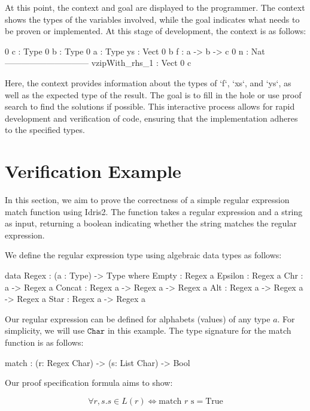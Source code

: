 \documentclass[]{rptuseminar}
\begin{document}
At this point, the context and goal are displayed to the programmer. The context shows the types of the variables involved, while the goal indicates what needs to be proven or implemented. At this stage of development, the context is as follows:

\begin{idris}
 0 c : Type
 0 b : Type
 0 a : Type
   ys : Vect 0 b
   f : a -> b -> c
 0 n : Nat
------------------------------
vzipWith_rhs_1 : Vect 0 c
\end{idris}

Here, the context provides information about the types of `f`, `xs`, and `ys`, as well as the expected type of the result. The goal is to fill in the hole or use proof search to find the solutions if possible. This interactive process allows for rapid development and verification of code, ensuring that the implementation adheres to the specified types.

\section{Verification Example}  
\label{sec:verification-example}  

In this section, we aim to prove the correctness of a simple regular expression match function using Idris2. The function takes a regular expression and a string as input, returning a boolean indicating whether the string matches the regular expression.

We define the regular expression type using algebraic data types as follows:

\begin{idris}
data Regex : (a : Type) -> Type where
  Empty   : Regex a
  Epsilon : Regex a
  Chr     : a -> Regex a
  Concat  : Regex a -> Regex a -> Regex a
  Alt     : Regex a -> Regex a -> Regex a
  Star    : Regex a -> Regex a
  
\end{idris}

Our regular expression can be defined for alphabets (values) of any type \( a \). For simplicity, we will use \( \texttt{Char} \) in this example. The type signature for the match function is as follows:

\begin{idris}
match : (r: Regex Char) -> (s: List Char) -> Bool
\end{idris}

Our proof specification formula aims to show:

\begin{equation}
\forall r, s. s \in L(r) \Leftrightarrow \text{match } r \text{ s} = \text{True}
\end{equation}
\end{document}
